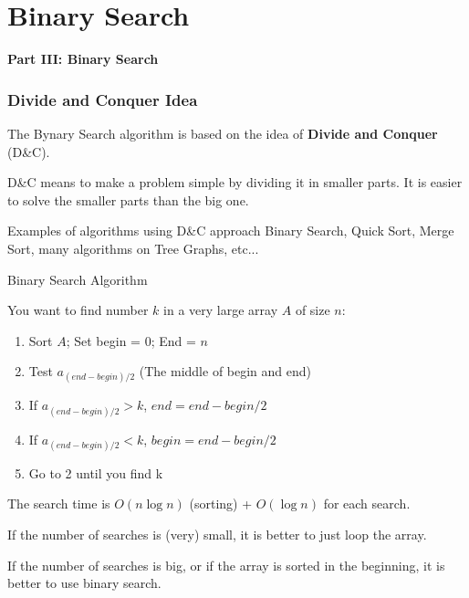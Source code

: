 
\section{Binary Search}
\begin{frame}{}{}
  \begin{center}
    {\bf Part III: Binary Search}
  \end{center}
\end{frame}

\begin{frame}
  \frametitle{Divide and Conquer Idea}

  The Bynary Search algorithm is based on the idea of {\bf Divide and Conquer}
  (D\&C).\bigskip

  D\&C means to make a problem simple by dividing it in smaller parts.
  It is easier to solve the smaller parts than the big one.
  \bigskip

  \begin{block}{Examples of algorithms using D\&C approach}
    Binary Search, Quick Sort, Merge Sort, many algorithms on Tree Graphs, etc...
  \end{block}
\end{frame}

\begin{frame}{Binary Search Algorithm}

  You want to find number $k$ in a very large array $A$ of size $n$:
  \bigskip

  \begin{enumerate}
  \item Sort $A$; Set begin = 0; End = $n$
  \item Test $a_{(end - begin)/2}$ (The middle of begin and end)
  \item If $a_{(end - begin)/2} > k$, $end = end - begin / 2$
  \item If $a_{(end - begin)/2} < k$, $begin = end - begin / 2$
  \item Go to 2 until you find k
  \end{enumerate}\bigskip

  The search time is $O(n\log n)$ (sorting) + $O(\log n)$ for each search.\bigskip

  If the number of searches is (very) small, it is better to just loop the array.\bigskip

  If the number of searches is big, or if the array is sorted in the beginning,
  it is better to use binary search.
\end{frame}

